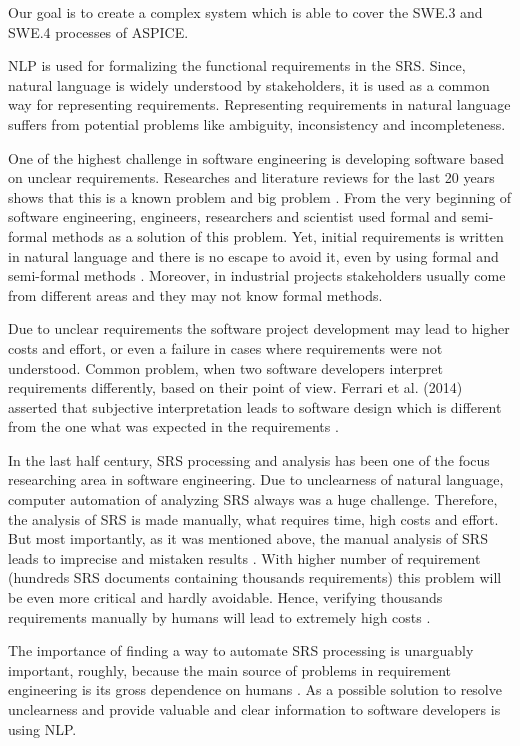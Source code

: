 	Our goal is to create a complex system which is able to cover the SWE.3 and SWE.4 processes of \gls{ASPICE}.
\begin{multicols}{2}	
	\gls{NLP} is used for formalizing the functional requirements in the \gls{SRS}. Since, natural language is widely understood by stakeholders, it is used as a common way for representing requirements. Representing requirements in natural language suffers from potential problems like ambiguity, inconsistency and incompleteness.
	
	One of the highest challenge in software engineering is developing software based on unclear requirements. Researches and literature reviews for the last 20 years shows that this is a known problem and big problem \cite{Besrour}. From the very beginning of software engineering, engineers, researchers and scientist used formal and semi-formal methods as a solution of this problem. Yet, initial requirements is written in natural language and there is no escape to avoid it, even by using formal and semi-formal methods \cite{Kamsties}. Moreover, in industrial projects stakeholders usually come from different areas and they may not know formal methods.
	
	Due to unclear requirements the software project development may lead to higher costs and effort, or even a failure in cases where requirements were not understood.
	Common problem, when two software developers interpret requirements differently, based on their point of view. Ferrari et al. (2014) asserted that subjective interpretation leads to software design which is different from the one what was expected in the requirements \cite{Ferrari}.
	
	In the last half century, \gls{SRS} processing and analysis has been one of the focus researching area in software engineering. Due to unclearness of natural language, computer automation of analyzing \gls{SRS} always was a huge challenge. Therefore, the analysis of \gls{SRS} is made manually, what requires time, high costs and effort. But most importantly, as it was mentioned above, the manual analysis of \gls{SRS} leads to imprecise and mistaken results \cite{Wang}. With higher number of requirement (hundreds \gls{SRS} documents containing thousands requirements) this problem will be even more critical and hardly avoidable. Hence, verifying thousands requirements manually by humans will lead to extremely high costs \cite{Fanmuy}.
	
	The importance of finding a way to automate \gls{SRS} processing is unarguably important, roughly, because the main source of problems in requirement engineering is its gross dependence on humans \cite{Ahmed}. As a possible solution to resolve unclearness and provide valuable and clear information to software developers is using \gls{NLP}.
	

\end{multicols}
